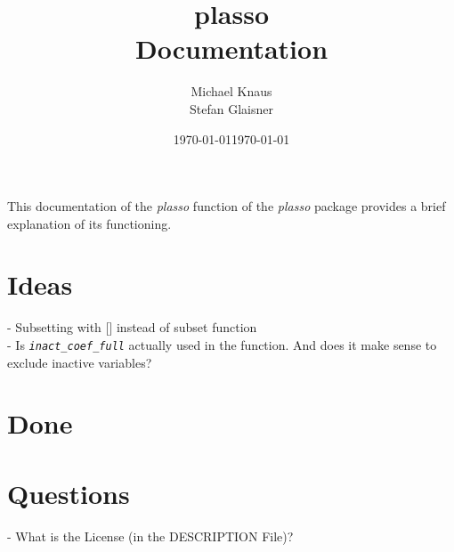 \documentclass[12pt]{article}
\title{\vspace{-2cm} plasso \\ Documentation}
\author{Michael Knaus \\ Stefan Glaisner}
\date{\today}
\date{\today}
\begin{document}
\maketitle

This documentation of the \emph{plasso} function of the \emph{plasso} package provides a brief explanation of its functioning.

\section{Ideas}
- Subsetting with [] instead of subset function \\
- Is \emph{\texttt{inact\_coef\_full}} actually used in the function. And does it make sense to exclude inactive variables?

\section{Done}


\section{Questions}
- What is the License (in the DESCRIPTION File)?
\end{document}
